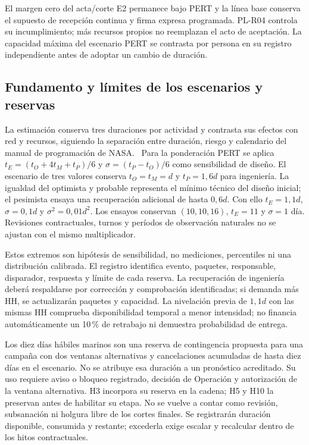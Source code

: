 El margen cero del acta/corte E2 permanece bajo PERT y la línea base conserva el supuesto de recepción continua y firma expresa programada. PL-R04 controla su incumplimiento; más recursos propios no reemplazan el acto de aceptación. La capacidad máxima del escenario PERT se contrasta por persona en su registro independiente antes de adoptar un cambio de duración.




\subsection{Fundamento y límites de los escenarios y reservas} %
La estimación conserva tres duraciones por actividad y contrasta sus efectos con red y recursos, siguiendo la separación entre duración, riesgo y calendario del manual de programación de NASA.~\parencite[secc.~6.3.1 y 7.4, pp.~38--40 y 59--60]{nasa-cronograma} Para la ponderación PERT se aplica $t_E=(t_O+4t_M+t_P)/6$ y $\sigma=(t_P-t_O)/6$ como sensibilidad de diseño. El escenario de tres valores conserva $t_O=t_M=d$ y $t_P=1,6d$ para ingeniería. La igualdad del optimista y probable representa el mínimo técnico del diseño inicial; el pesimista ensaya una recuperación adicional de hasta $0,6d$. Con ello $t_E=1,1d$, $\sigma=0,1d$ y $\sigma^2=0,01d^2$. Los ensayos conservan $(10,10,16)$, $t_E=11$ y $\sigma=1$ día. Revisiones contractuales, turnos y períodos de observación naturales no se ajustan con el mismo multiplicador.

Estos extremos son hipótesis de sensibilidad, no mediciones, percentiles ni una distribución calibrada. El registro  identifica evento, paquetes, responsable, disparador, respuesta y límite de cada reserva. La recuperación de ingeniería deberá respaldarse por corrección y comprobación identificadas; si demanda más HH, se actualizarán paquetes y capacidad. La nivelación previa de $1,1d$ con las mismas HH comprueba disponibilidad temporal a menor intensidad; no financia automáticamente un 10\,\% de retrabajo ni demuestra probabilidad de entrega.

Los diez días hábiles marinos son una reserva de contingencia propuesta para una campaña con dos ventanas alternativas y cancelaciones acumuladas de hasta diez días en el escenario. No se atribuye esa duración a un pronóstico acreditado. Su uso requiere aviso o bloqueo registrado, decisión de Operación y autorización de la ventana alternativa. H3 incorpora su reserva en la cadena; H5 y H10 la preservan antes de habilitar su etapa. No se vuelve a contar como revisión, subsanación ni holgura libre de los cortes finales. Se registrarán duración disponible, consumida y restante; excederla exige escalar y recalcular dentro de los hitos contractuales.

